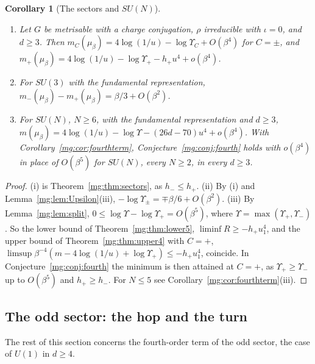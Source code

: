 \documentclass[11pt,a4paper]{article}
\newtheorem{corollary}[theorem]{Corollary}
\theoremstyle{definition}
\theoremstyle{remark}
\begin{document}
\begin{corollary}[The sectors and $SU(N)$]\label{mg:cor:sectors}
\begin{enumerate}[label=(\roman*)]
\item Let $G$ be metrisable with a charge conjugation, $\rho$ irreducible with $\iota=0$, and $d\ge3$. Then $m_C(\mu_\beta)=4\log(1/u)-\log\Upsilon_C+O(\beta^4)$ for $C=\pm$, and
$m_+(\mu_\beta)=4\log(1/u)-\log\Upsilon_+-h_+u^4+o(\beta^4)$.
\item For $SU(3)$ with the fundamental representation, $m_-(\mu_\beta)-m_+(\mu_\beta)=\beta/3+O(\beta^2)$.
\item For $SU(N)$, $N\ge6$, with the fundamental representation and $d\ge3$, $m(\mu_\beta)=4\log(1/u)-\log\Upsilon-(26d-70)u^4+o(\beta^4)$. With
Corollary~\ref{mg:cor:fourthterm}, Conjecture~\ref{mg:conj:fourth} holds with $o(\beta^4)$ in place of $O(\beta^5)$ for $SU(N)$, every $N\ge2$, in every $d\ge3$.
\end{enumerate}
\end{corollary}

\begin{proof}
(i) is Theorem~\ref{mg:thm:sectors}, as $h_-\le h_+$. (ii) By (i) and Lemma~\ref{mg:lem:Upsilon}(iii), $-\log\Upsilon_\pm=\mp\beta/6+O(\beta^2)$. (iii) By Lemma~\ref{mg:lem:split},
$0\le\log\Upsilon-\log\Upsilon_+=O(\beta^5)$, where $\Upsilon=\max(\Upsilon_+,\Upsilon_-)$. So the lower bound of Theorem~\ref{mg:thm:lower5}, $\liminf R\ge-h_+u_1^4$, and the
upper bound of Theorem~\ref{mg:thm:upper4} with $C=+$, $\limsup\beta^{-4}(m-4\log(1/u)+\log\Upsilon_+)\le-h_+u_1^4$, coincide. In Conjecture~\ref{mg:conj:fourth} the minimum is
then attained at $C=+$, as $\Upsilon_+\ge\Upsilon_-$ up to $O(\beta^5)$ and $h_+\ge h_-$. For $N\le5$ see Corollary~\ref{mg:cor:fourthterm}(iii).
\end{proof}

\subsection*{The odd sector: the hop and the turn}

The rest of this section concerns the fourth-order term of the odd sector, the case of $U(1)$ in $d\ge4$.
\end{document}
